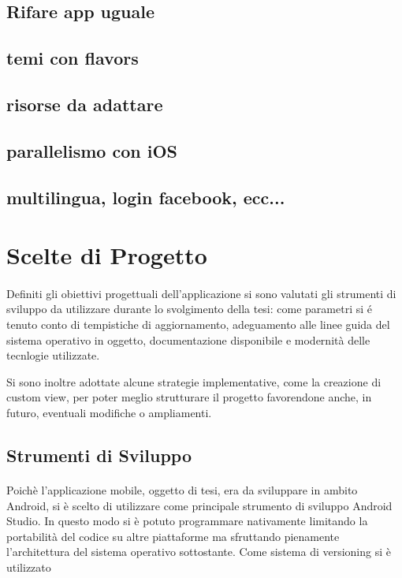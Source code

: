 \documentclass{article}
\begin{document}
  \subsection{Rifare app uguale}

  \subsection{temi con flavors}

  \subsection{risorse da adattare}

  \subsection{parallelismo con iOS}

  \subsection{multilingua, login facebook, ecc...}
  \newpage
  \section{Scelte di Progetto}
  \paragraph{}
Definiti gli obiettivi progettuali dell'applicazione si sono valutati gli strumenti di sviluppo da utilizzare durante lo svolgimento della tesi: come parametri si é tenuto conto di tempistiche di aggiornamento, adeguamento alle linee guida del sistema operativo in oggetto, documentazione disponibile e modernità delle tecnlogie utilizzate.

Si sono inoltre adottate alcune strategie implementative, come la creazione di custom view, per poter meglio strutturare il progetto favorendone anche, in futuro, eventuali modifiche o ampliamenti.

\subsection{Strumenti di Sviluppo}
  \paragraph{}
Poichè l'applicazione mobile, oggetto di tesi, era da sviluppare in ambito Android, si è scelto di utilizzare come principale strumento di sviluppo Android Studio.
In questo modo si è potuto programmare nativamente limitando la portabilità del codice su altre piattaforme ma sfruttando pienamente l'architettura del sistema operativo sottostante.
Come sistema di versioning si è utilizzato 
\end{document}
